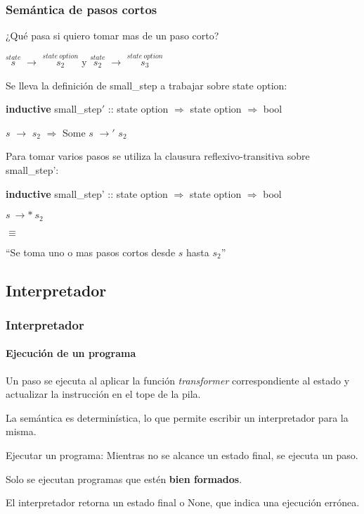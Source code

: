 \begin{frame}
\frametitle{Semántica de pasos cortos}

¿Qué pasa si quiero tomar mas de un paso corto?

\bigskip

$\overset{state}{s}$ $\rightarrow$ $\overset{state\ option}{s_2}$ y $\overset{state}{s_2}$ $\rightarrow$ $\overset{state\ option}{s_3}$

\bigskip
\pause

Se lleva la definición de small\_step a trabajar sobre state option:

\bigskip
\textbf{inductive} small\_step$'$ :: state option $\Rightarrow$ state option $\Rightarrow$ bool
\bigskip

$s$ $\rightarrow$ $s_2$ $\Longrightarrow$ Some $s$ $\rightarrow'$ $s_2$
\bigskip
\pause

Para tomar varios pasos se utiliza la clausura reflexivo-transitiva sobre small\_step':

\bigskip
\textbf{inductive} small\_step' :: state option $\Rightarrow$ state option $\Rightarrow$ bool
\bigskip

$s\ \rightarrow*\ s_2$

$\equiv$

``Se toma uno o mas pasos cortos desde $s$ hasta $s_2$''



\end{frame}


\subsection{Interpretador}


\begin{frame}
\frametitle{Interpretador}
\framesubtitle{Ejecución de un programa}

Un paso se ejecuta al aplicar la función \textit{transformer} correspondiente al estado y actualizar la instrucción en el tope de la pila.
\bigskip
\pause

La semántica es determinística, lo que permite escribir un interpretador para la misma.
\bigskip
\pause

\begin{block}{Ejecutar un programa:}
Mientras no se alcance un estado final, se ejecuta un paso.
\end{block}

\pause

Solo se ejecutan programas que estén \textbf{bien formados}.

\bigskip

El interpretador retorna un estado final o None, que indica una ejecución errónea.

\end{frame}

